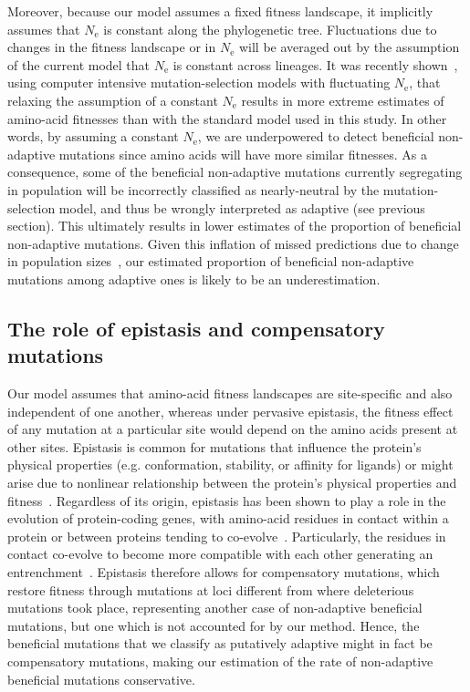 \documentclass[10pt,letterpaper]{article}
\newcommand{\Ne}{N_{\text{e}}}
\begin{document}
Moreover, because our model assumes a fixed fitness landscape, it implicitly assumes that $\Ne$ is constant along the phylogenetic tree.
Fluctuations due to changes in the fitness landscape or in $\Ne$ will be averaged out by the assumption of the current model that $\Ne$ is constant across lineages.
It was recently shown~\cite{latrille_inferring_2021}, using computer intensive mutation-selection models with fluctuating $\Ne$, that relaxing the assumption of a constant $\Ne$ results in more extreme estimates of amino-acid fitnesses than with the standard model used in this study.
In other words, by assuming a constant $\Ne$, we are underpowered to detect beneficial non-adaptive mutations since amino acids will have more similar fitnesses.
As a consequence, some of the beneficial non-adaptive mutations currently segregating in population will be incorrectly classified as nearly-neutral by the mutation-selection model, and thus be wrongly interpreted as adaptive (see previous section).
This ultimately results in lower estimates of the proportion of beneficial non-adaptive mutations.
Given this inflation of missed predictions due to change in population sizes~\cite{lanfear_population_2014, jones_shifting_2017, platt_protein_2018}, our estimated proportion of beneficial non-adaptive mutations among adaptive ones is likely to be an underestimation.

\subsection*{The role of epistasis and compensatory mutations}

Our model assumes that amino-acid fitness landscapes are site-specific and also independent of one another, whereas under pervasive epistasis, the fitness effect of any mutation at a particular site would depend on the amino acids present at other sites.
Epistasis is common for mutations that influence the protein’s physical properties (e.g. conformation, stability, or affinity for ligands) or might arise due to nonlinear relationship between the protein’s physical properties and fitness~\cite{starr_epistasis_2016}.
Regardless of its origin, epistasis has been shown to play a role in the evolution of protein-coding genes, with amino-acid residues in contact within a protein or between proteins tending to co-evolve~\cite{morcos_directcoupling_2011, marks_protein_2012, starr_epistasis_2016}.
Particularly, the residues in contact co-evolve to become more compatible with each other generating an entrenchment~\cite{goldstein_nonadaptive_2015, goldstein_sequence_2017, park_epistatic_2022}.
Epistasis therefore allows for compensatory mutations, which restore fitness through mutations at loci different from where deleterious mutations took place, representing another case of non-adaptive beneficial mutations, but one which is not accounted for by our method.
Hence, the beneficial mutations that we classify as putatively adaptive might in fact be compensatory mutations, making our estimation of the rate of non-adaptive beneficial mutations conservative.
\end{document}
